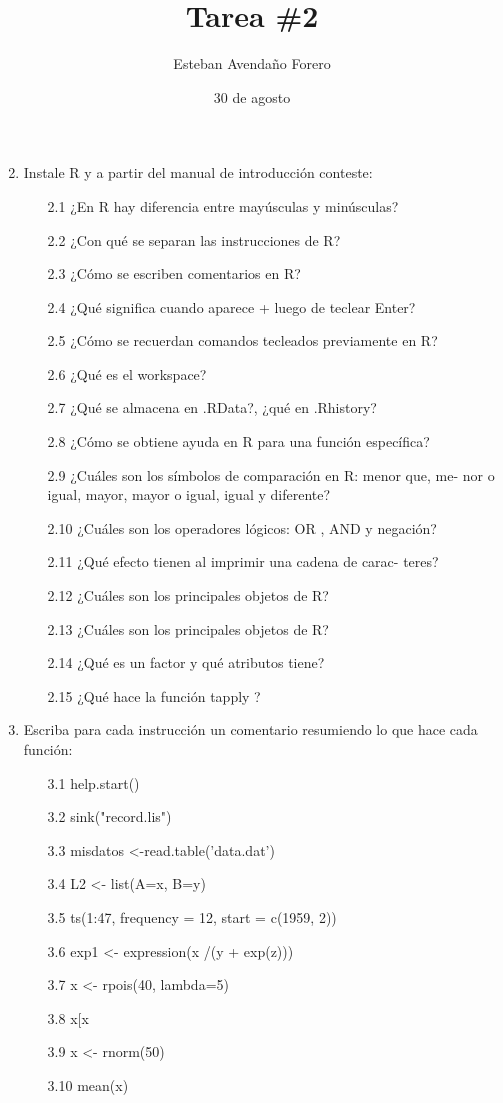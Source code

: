 \documentclass[letterpaper, 12pt]{article}
\title{Tarea \#2}
\author{Esteban Avendaño Forero}
\date{30 de agosto}
\begin{document}

\maketitle

\begin{enumerate}
\setcounter{enumi}{1}
\item Instale R y a partir del manual de introducción conteste:
\begin{enumerate}
\item[2.1] ¿En R hay diferencia entre mayúsculas y minúsculas?
\item[2.2] ¿Con qué se separan las instrucciones de R?
\item[2.3] ¿Cómo se escriben comentarios en R?
\item[2.4] ¿Qué significa cuando aparece + luego de teclear Enter?
\item[2.5] ¿Cómo se recuerdan comandos tecleados previamente en R?
\item[2.6] ¿Qué es el workspace?
\item[2.7] ¿Qué se almacena en .RData?, ¿qué en .Rhistory?
\item[2.8] ¿Cómo se obtiene ayuda en R para una función específica?
\item[2.9] ¿Cuáles son los símbolos de comparación en R: menor que, me-
nor o igual, mayor, mayor o igual, igual y diferente?
\item[2.10] ¿Cuáles son los operadores lógicos: OR , AND y negación?
\item[2.11] ¿Qué efecto tienen  al imprimir una cadena de carac-
teres?
\item[2.12] ¿Cuáles son los principales objetos de R?
\item[2.13] ¿Cuáles son los principales objetos de R?
\item[2.14] ¿Qué es un factor y qué atributos tiene?
\item[2.15] ¿Qué hace la función tapply ?
\end{enumerate}

\item Escriba para cada instrucción un comentario resumiendo lo que hace
cada función:
\begin{enumerate}
\item[3.1] help.start()
\item[3.2] sink("record.lis")
\item[3.3] misdatos <-read.table('data.dat')
\item[3.4] L2 <- list(A=x, B=y)
\item[3.5] ts(1:47, frequency = 12, start = c(1959, 2))
\item[3.6] exp1 <- expression(x /(y + exp(z)))
\item[3.7] x <- rpois(40, lambda=5)
\item[3.8] x[x %
\item[3.9] x <- rnorm(50)
\item[3.10] mean(x)
\end{enumerate}


\end{enumerate}
\end{document}
